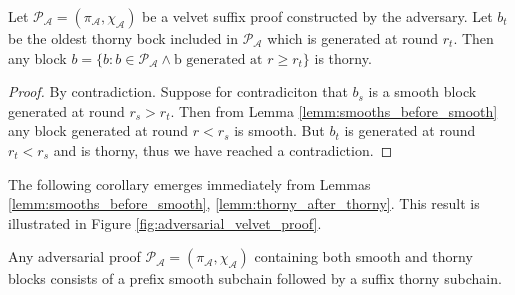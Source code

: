 \begin{lemma}
	Let $\mathcal{P_A} = (\pi_\mathcal{A}, \chi_\mathcal{A})$ be a velvet suffix proof constructed by the adversary. Let $b_t$ be the oldest thorny bock included in $\mathcal{P_A}$ which is generated at round $r_t$. Then any block $b = \{b: b \in \mathcal{P_A} \wedge \text{b generated at }r \geq r_t \}$ is thorny.
	\label{lemm:thorny_after_thorny}
\end{lemma}
\begin{proof}
By contradiction. Suppose for contradiciton that $b_s$ is a smooth block generated at round $r_s > r_t$. Then from Lemma \ref{lemm:smooths_before_smooth} any block generated at round $r < r_s$ is smooth. But $b_t$ is generated at round $r_t < r_s$ and is thorny, thus we have reached a contradiction.
\end{proof}

The following corollary emerges immediately from Lemmas \ref{lemm:smooths_before_smooth}, \ref{lemm:thorny_after_thorny}. This result is illustrated in Figure \ref{fig:adversarial_velvet_proof}.

\begin{corollary}
	Any adversarial proof $\mathcal{P_A} = (\pi_\mathcal{A}, \chi_\mathcal{A})$ containing both smooth and thorny blocks consists of a prefix smooth subchain followed by a suffix thorny subchain.
	\label{cor:adversarial_proof_scheme}
\end{corollary}


